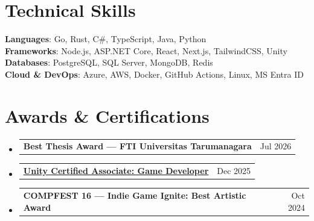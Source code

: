 \documentclass[letterpaper,11pt]{article}
\makeatletter
\newcommand{\resumeProjectHeading}[2]{
    \item
    \begin{tabular*}{0.97\textwidth}{l@{\extracolsep{\fill}}r}
      \small#1 & #2 \\
    \end{tabular*}\vspace{-8pt}
}
\newcommand{\resumeSubHeadingListStart}{\begin{itemize}[leftmargin=0.15in, label={}]}
\newcommand{\resumeSubHeadingListEnd}{\end{itemize}}
\makeatother
\begin{document}
\section{Technical Skills}
 \begin{itemize}[leftmargin=0.15in, label={}]
    \small{\item{
     \textbf{Languages}{: Go, Rust, C\#, TypeScript, Java, Python} \\
     \textbf{Frameworks}{: Node.js, ASP.NET Core, React, Next.js, TailwindCSS, Unity} \\
     \textbf{Databases}{: PostgreSQL, SQL Server, MongoDB, Redis} \\
     \textbf{Cloud \& DevOps}{: Azure, AWS, Docker, GitHub Actions, Linux, MS Entra ID}
    }}
 \end{itemize}

\section{Awards \& Certifications}
\resumeSubHeadingListStart
  \resumeProjectHeading
    {\textbf{Best Thesis Award — FTI Universitas Tarumanagara}}{Jul 2026}
  \resumeProjectHeading
    {\textbf{\href{https://www.credly.com/badges/1d544635-9522-4410-8380-66f1141323d8/print}{Unity Certified Associate: Game Developer}}}{Dec 2025}
  \resumeProjectHeading
    {\textbf{COMPFEST 16 — Indie Game Ignite: Best Artistic Award}}{Oct 2024}
\resumeSubHeadingListEnd



\end{document}
